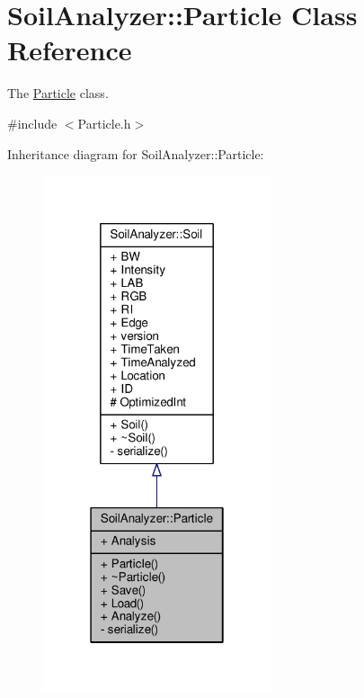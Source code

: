 \hypertarget{class_soil_analyzer_1_1_particle}{}\section{Soil\+Analyzer\+:\+:Particle Class Reference}
\label{class_soil_analyzer_1_1_particle}


The \hyperlink{class_soil_analyzer_1_1_particle}{Particle} class.  




{\ttfamily \#include $<$Particle.\+h$>$}



Inheritance diagram for Soil\+Analyzer\+:\+:Particle\+:\nopagebreak
\begin{figure}[H]
\begin{center}
\leavevmode
\includegraphics[width=190pt]{class_soil_analyzer_1_1_particle__inherit__graph}
\end{center}
\end{figure}


